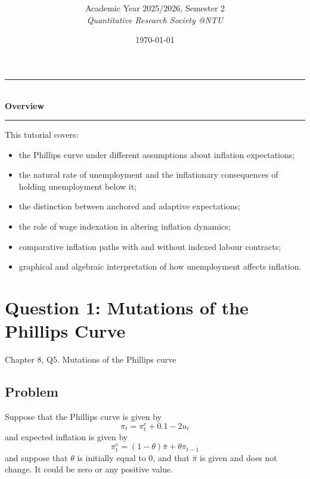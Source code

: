 \documentclass[12pt]{article}
\title{
\CourseCode \CourseName \\[0.3em]
\large \DocType
}
\author{
  Academic Year 2025/2026, Semester 2 \\[0.25em]
  \textit{Quantitative Research Society @NTU}
}
\date{\today}
\begin{document}
\maketitle
\thispagestyle{plainfirst}
\pagestyle{main}
\bigskip

\begin{center}
  \rule{0.8\textwidth}{0.4pt}\\[4pt]
  \textbf{Overview}\\[2pt]
  \rule{0.8\textwidth}{0.4pt}
\end{center}

\noindent
This tutorial covers:
\begin{itemize}[leftmargin=*]
  \item the Phillips curve under different assumptions about inflation expectations;
  \item the natural rate of unemployment and the inflationary consequences of holding unemployment below it;
  \item the distinction between anchored and adaptive expectations;
  \item the role of wage indexation in altering inflation dynamics;
  \item comparative inflation paths with and without indexed labour contracts;
  \item graphical and algebraic interpretation of how unemployment affects inflation.
\end{itemize}

\bigskip

\newpage
\tableofcontents

\newpage
\section{Question 1: Mutations of the Phillips Curve}

\noindent
Chapter 8, Q5. Mutations of the Phillips curve

\subsection{Problem}
Suppose that the Phillips curve is given by
\[
\pi_t=\pi_t^e+0.1-2u_t
\]
and expected inflation is given by
\[
\pi_t^e=(1-\theta)\bar{\pi}+\theta\pi_{t-1}
\]
and suppose that \(\theta\) is initially equal to 0, and that \(\bar{\pi}\) is given and does not change. It could be zero or any positive value.
\end{document}
